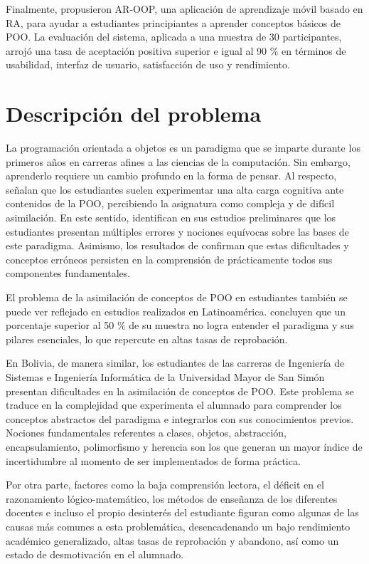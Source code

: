 Finalmente, \textcite{Hang2023} propusieron AR-OOP, una aplicación de 
aprendizaje móvil basado en RA, para ayudar a estudiantes principiantes a 
aprender conceptos básicos de POO. La evaluación del sistema, aplicada a una 
muestra de 30 participantes, arrojó una tasa de aceptación positiva superior 
e igual al 90 \% en términos de usabilidad, interfaz de usuario, satisfacción 
de uso y rendimiento.   

\section{Descripción del problema}
La programación orientada a objetos es un paradigma que se imparte 
durante los primeros años en carreras afines a las ciencias de la computación. 
Sin embargo, aprenderlo requiere un cambio profundo en la forma de pensar. 
Al respecto, \textcite{Batiha2023} señalan que los estudiantes suelen 
experimentar una alta carga cognitiva ante contenidos de la POO, percibiendo 
la asignatura como compleja y de difícil asimilación. En este sentido, 
\textcite{Shmallo2025} identifican en sus estudios preliminares que los 
estudiantes presentan múltiples errores y nociones equívocas sobre las bases 
de este paradigma. Asimismo, los resultados de \textcite{Abbasi2021} confirman 
que estas dificultades y conceptos erróneos persisten en la comprensión de 
prácticamente todos sus componentes fundamentales. 

El problema de la asimilación de conceptos de POO en estudiantes también se 
puede ver reflejado en estudios realizados en Latinoamérica. 
\textcite{Quirino2024} concluyen que un porcentaje superior al 50 \% de su 
muestra no logra entender el paradigma y sus pilares esenciales, lo que 
repercute en altas tasas de reprobación.

En Bolivia, de manera similar, los estudiantes de las carreras de Ingeniería 
de Sistemas e Ingeniería Informática de la Universidad Mayor de San Simón 
presentan dificultades en la asimilación de conceptos de POO. Este problema se 
traduce en la complejidad que experimenta el alumnado para comprender los 
conceptos abstractos del paradigma e integrarlos con sus conocimientos previos. 
Nociones fundamentales referentes a clases, objetos, abstracción, 
encapsulamiento, polimorfismo y herencia son los que generan un mayor índice de 
incertidumbre al momento de ser implementados de forma práctica.

Por otra parte, factores como la baja comprensión lectora, el déficit en el 
razonamiento lógico-matemático, los métodos de enseñanza de los diferentes 
docentes e incluso el propio desinterés del estudiante figuran como algunas 
de las causas más comunes a esta problemática, desencadenando un bajo 
rendimiento académico generalizado, altas tasas de reprobación y abandono, 
así como un estado de desmotivación en el alumnado.



